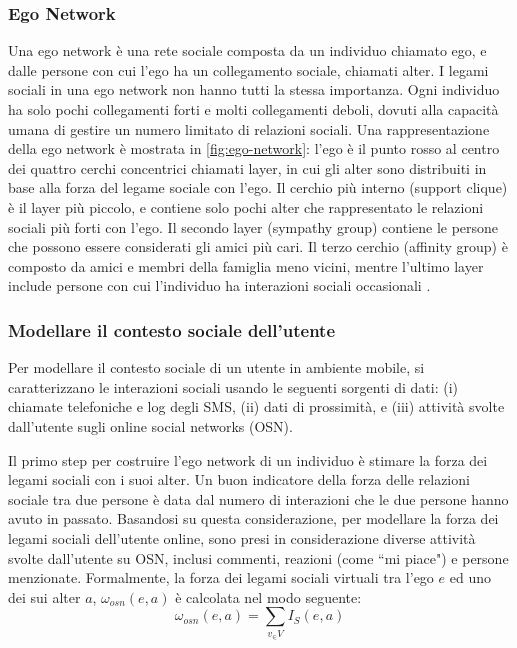 \documentclass[12pt,italian]{report}
\begin{document}
\subsubsection{Ego Network}
Una ego network è una rete sociale composta da un individuo chiamato ego, e dalle persone con cui l'ego ha un collegamento sociale, chiamati alter. I legami sociali in una ego network non hanno tutti la stessa importanza. Ogni individuo ha solo pochi collegamenti forti e molti collegamenti deboli, dovuti alla capacità umana di gestire un numero limitato di relazioni sociali. Una rappresentazione della ego network è mostrata in \autoref{fig:ego-network}: l'ego è il punto rosso al centro dei quattro cerchi concentrici chiamati layer, in cui gli alter sono distribuiti in base alla forza del legame sociale con l'ego. Il cerchio più interno (support clique) è il layer più piccolo, e contiene solo pochi alter che rappresentato le relazioni sociali più forti con l'ego. Il secondo layer (sympathy group) contiene le persone che possono essere considerati gli amici più cari. Il terzo cerchio (affinity group) è composto da amici e membri della famiglia meno vicini, mentre l'ultimo layer include persone con cui l'individuo ha interazioni sociali occasionali \cite{ego-net}.

\subsubsection{Modellare il contesto sociale dell'utente}
Per modellare il contesto sociale di un utente in ambiente mobile, si caratterizzano le interazioni sociali usando le seguenti sorgenti di dati: (i) chiamate telefoniche e log degli SMS, (ii) dati di prossimità, e (iii) attività svolte dall'utente sugli online social networks (OSN).

Il primo step per costruire l'ego network di un individuo è stimare la forza dei legami sociali con i suoi alter. Un buon indicatore della forza delle relazioni sociale tra due persone è data dal numero di interazioni che le due persone hanno avuto in passato. Basandosi su questa considerazione, per modellare la forza dei legami sociali dell'utente online, sono presi in considerazione diverse attività svolte dall'utente su OSN, inclusi commenti, reazioni (come ``mi piace") e persone menzionate. Formalmente, la forza dei legami sociali virtuali tra l'ego $e$ ed uno dei sui alter $a$, $\omega_{osn}(e,a)$ è calcolata nel modo seguente:
\begin{equation}	
	\omega_{osn}(e,a)=\sum_{v_\in V}I_S (e, a)
\end{equation}
\end{document}
